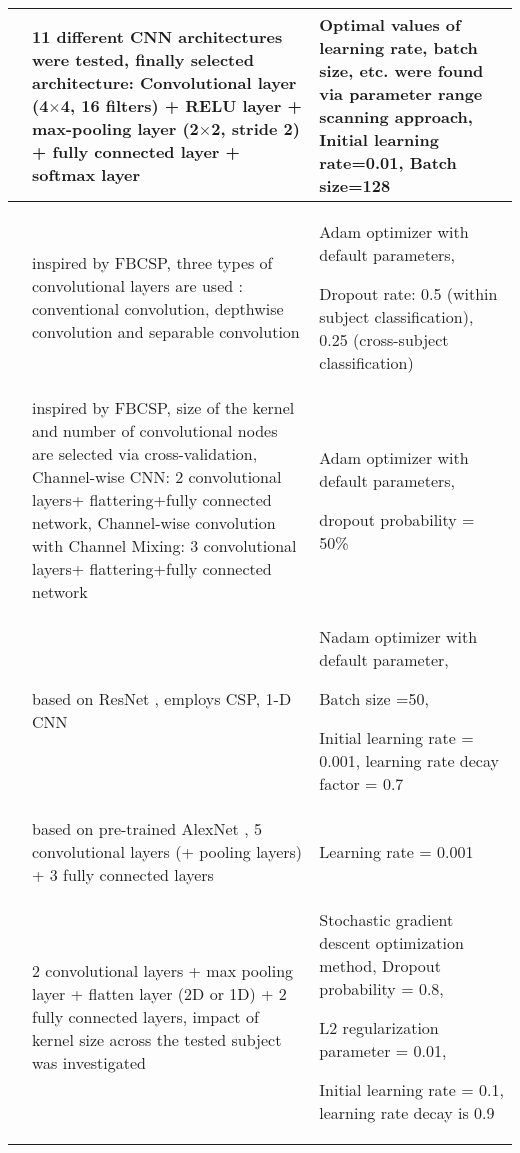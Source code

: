 \documentclass{ieeeaccess}
\begin{document}
\begin{table*}
\begin{tabular}{|p{0.6cm}|p{9cm}|p{5cm}|}
            \cite{uktveris2017application} & 11 different CNN architectures were tested, finally selected architecture: Convolutional layer (4$\times$4, 16 filters) + RELU layer + max-pooling layer (2$\times$2, stride 2) + fully connected layer + softmax layer%
            & Optimal values of learning rate, batch size, etc. were found via parameter range scanning approach, Initial learning rate=0.01, Batch size=128 \\\hline 
            \cite{lawhern2016eegnet}    & inspired by FBCSP, three types of convolutional layers are used : conventional convolution, depthwise convolution and separable convolution \cite{chollet2017xception}%
            & Adam optimizer with default parameters, \par Dropout rate: 0.5 (within subject classification), 0.25 (cross-subject classification)\\
            \hline   
            \cite{sakhavi2018learning}  & inspired by FBCSP, size of the kernel and number of convolutional nodes are selected via cross-validation, Channel-wise CNN: 2 convolutional layers+ flattering+fully connected network, Channel-wise convolution with Channel Mixing: 3  convolutional layers+ flattering+fully connected network &  Adam optimizer with default parameters, \par dropout probability = 50\% \\
            \hline
            \cite{zhu2019separated}  & based on ResNet \cite{he2016deep}, employs CSP, 1-D CNN  & Nadam optimizer with default parameter, \par Batch size =50, \par Initial learning rate = 0.001, learning rate decay factor = 0.7 \\\hline
            \cite{chaudhary2019convolutional}   & based on pre-trained AlexNet \cite{krizhevsky2012imagenet}, 5 convolutional layers (+ pooling layers) + 3 fully connected layers &  Learning rate = 0.001 \\
            \hline               
            
            \cite{dai2019hs} & 2 convolutional layers + max pooling layer + flatten layer (2D or 1D) + 2 fully connected layers, impact of kernel size across the tested subject was investigated & Stochastic gradient descent optimization method, Dropout probability = 0.8,\par
            L2 regularization parameter = 0.01,\par
            Initial learning rate = 0.1, learning rate decay is 0.9\\
            \hline   
            

\end{tabular}
\end{table*}
\end{document}
